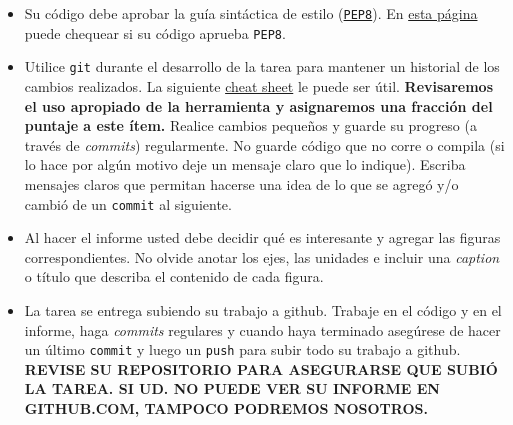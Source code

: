 \documentclass[letter, 11pt]{article}
\begin{document}
\begin{itemize}
\item Su código debe aprobar la guía sintáctica de estilo
  (\href{https://www.python.org/dev/peps/pep-0008/}{\texttt{PEP8}}). En
  \href{http://pep8online.com}{esta página} puede chequear si su código aprueba
  \texttt{PEP8}.

\item Utilice \texttt{git} durante el desarrollo de la tarea para mantener un
  historial de los cambios realizados. La siguiente
  \href{https://education.github.com/git-cheat-sheet-education.pdf}{cheat
    sheet} le puede ser útil. {\bf Revisaremos el uso apropiado de la
  herramienta y asignaremos una fracción del puntaje a este ítem.} Realice
  cambios pequeños y guarde su progreso (a través de \emph{commits})
  regularmente. No guarde código que no corre o compila (si lo hace por algún
  motivo deje un mensaje claro que lo indique). Escriba mensajes claros que
  permitan hacerse una idea de lo que se agregó y/o cambió de un
  \texttt{commit} al siguiente.

\item Al hacer el informe usted debe decidir qué es interesante y agregar las
  figuras correspondientes. No olvide anotar los ejes, las unidades e incluir
  una \emph{caption} o título que describa el contenido de cada figura.

\item La tarea se entrega subiendo su trabajo a github. Trabaje en el código y
  en el informe, haga \textit{commits} regulares y cuando haya terminado
  asegúrese de hacer un último \texttt{commit} y luego un \texttt{push} para
  subir todo su trabajo a github. \textbf{REVISE SU REPOSITORIO PARA ASEGURARSE
  QUE SUBIÓ LA TAREA. SI UD. NO PUEDE VER SU INFORME EN GITHUB.COM, TAMPOCO
PODREMOS NOSOTROS.}

\end{itemize}
\end{document}
